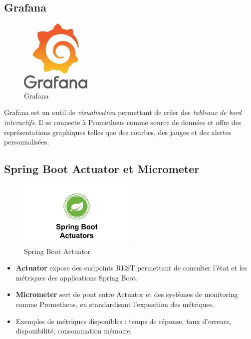 \subsection{Grafana}
\begin{figure}[H]
\centering
\includegraphics[width=0.3\textwidth]{images/grafana.jpeg}
\caption{Grafana}
\label{fig:architecture-overview}
\end{figure}
Grafana est un outil de \textit{visualisation} permettant de créer des \textit{tableaux de bord interactifs}. Il se connecte à Prometheus comme source de données et offre des représentations graphiques telles que des courbes, des jauges et des alertes personnalisées.

\subsection{Spring Boot Actuator et Micrometer}
\begin{figure}[H]
\centering
\includegraphics[width=0.5\textwidth]{images/spring_boot_actuators.jpg}
\caption{Spring Boot Actuator}
\label{fig:architecture-overview}
\end{figure}
\begin{itemize}
    \item \textbf{Actuator} expose des endpoints REST permettant de consulter l’état et les métriques des applications Spring Boot.
    \item \textbf{Micrometer} sert de pont entre Actuator et des systèmes de monitoring comme Prometheus, en standardisant l’exposition des métriques.
    \item Exemples de métriques disponibles : temps de réponse, taux d’erreurs, disponibilité, consommation mémoire.
\end{itemize}


